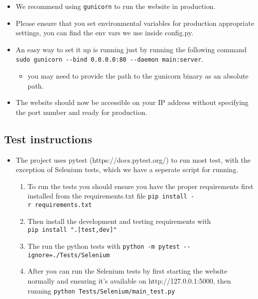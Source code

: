 \documentclass[main.tex]{subfiles}
\begin{document}
\begin{itemize}

\item
  We recommend using \texttt{gunicorn} to run the website in production.
\item
  Please ensure that you set environmental variables for production
  appropriate settings, you can find the env vars we use inside
  config.py.
\item
  An easy way to set it up is running just by running the following
  command
  \texttt{sudo\ gunicorn\ -\/-bind\ 0.0.0.0:80\ -\/-daemon\ main:server}.

  \begin{itemize}

  \item
    you may need to provide the path to the gunicorn binary as an
    absolute path.
  \end{itemize}
\item
  The website should now be accessible on your IP address without
  specifying the port number and ready for production.
\end{itemize}

\subsection{Test instructions}\label{test-instructions}

\begin{itemize}
\item
  The project uses pytest (https://docs.pytest.org/) to run most test,
  with the exception of Selenium tests, which we have a seperate script
  for running.

  \begin{enumerate}
  \def\labelenumi{\arabic{enumi}.}
  \item
    To run the tests you should ensure you have the proper requirements
    first installed from the requirements.txt file
    \texttt{pip\ install\ -r\ requirements.txt}
  \item
    Then install the development and testing requirements with
    \texttt{pip\ install\ ".{[}test,dev{]}"}
  \item
    The run the python tests with
    \texttt{python\ -m\ pytest\ -\/-ignore=./Tests/Selenium}
  \item
    After you can run the Selenium tests by first starting the website
    normally and ensuring it's available on http://127.0.0.1:5000, then
    running \texttt{python\ Tests/Selenium/main\_test.py}
  \end{enumerate}
\end{itemize}
\end{document}
